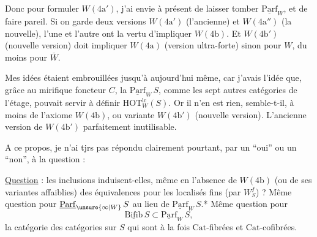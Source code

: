 Donc pour formuler $W(4\mathrm a')$, j'ai envie
à présent de laisser tomber $\underline{\mathrm{Parf}}_W$, et de faire pareil.
Si on garde deux versions $W(4\mathrm a')$ (l'ancienne)
et $W(4\mathrm a'')$ (la nouvelle), l'une et l'autre ont
la vertu d'impliquer $W(4\mathrm b)$. Et $W(4\mathrm b')$ (nouvelle
version) doit impliquer $W(4\mathrm a)$ (version ultra-forte)
sinon pour $W$, du moins pour $\overline W$.

Mes idées étaient  embrouillées
jusqu'à aujourd'hui même, car j'avais l'idée
que, grâce au mirifique foncteur $C$, la 
$\underline{\mathrm{Parf}}_W\,S$, comme les sept autres catégories de l'étage,
pouvait servir à définir $\mathrm{HOT}_W^{\mathrm{lc}}(S)$. Or il n'en est
rien, semble-t-il, à moins de  l'axiome
$W(4\mathrm b)$, ou  variante $W(4\mathrm b')$ (nouvelle
version). L'ancienne version de $W(4\mathrm b')$ 
parfaitement inutilisable.

A ce propos, je n'ai tjrs pas répondu clairement
pourtant, par un ``oui'' ou un ``non'', à la question :

\uline{Question} : les inclusions
induisent-elles, même en l'absence de $W(4\mathrm b)$
(ou de ses variantes affaiblies) des équivalences
pour les localisés fins (par $W_S^f$) ? Même
question pour $\underline{\mathrm{Parf}}_{\unsure{\infty|W}}\,S$ au lieu de $\underline{\mathrm{Parf}}_W\,S$.* 
Même question pour
\[
\underline{\mathrm{Bifib}}\,S\subset\underline{\mathrm{Parf}}_W\,S,
\]
la catégorie des catégories  sur $S$ qui sont à
la fois $\mathrm{Cat}$-fibrées et $\mathrm{Cat}$-cofibrées. 

